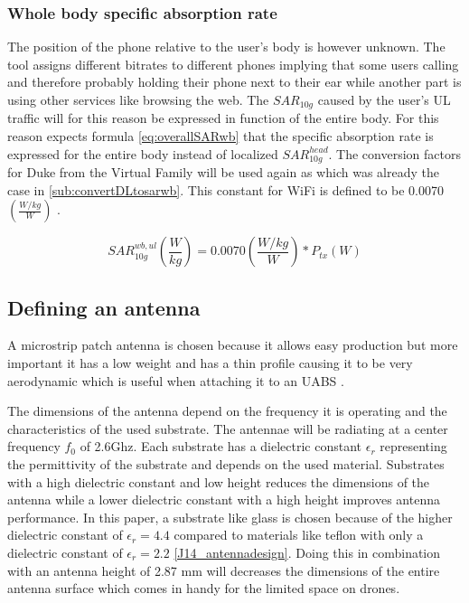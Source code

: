 \subsubsection{Whole body specific absorption rate}
The position of the phone relative to the user's body is however unknown. The tool assigns different bitrates to different phones implying 
that some users calling and therefore probably holding their phone next to their ear while another part is using other services like browsing the web.
The $SAR_{10g}$ caused by the user's \gls{UL} traffic will for this reason be expressed in function of the entire body.
For this reason expects formula \ref{eq:overallSARwb} that the specific absorption rate is expressed for the entire body instead of localized $SAR^{head}_{10g}$.
The conversion factors for Duke from the Virtual Family will be used again as which was already the case in \ref{sub:convertDLtosarwb}. This constant 
for WiFi is defined to be 0.0070 $\left(\frac{W/kg}{W}\right)$ \cite{J22_plets2015joint}.

\begin{equation} 
SAR^{wb,ul}_{10g} \left(\frac{W}{kg}\right) = 0.0070 \left(\frac{W/kg}{W}\right) * P_{tx} (W)
\label{eq:solve}
\end{equation}

\subsection{Defining an antenna}
\label{sub:definingAntenna}
A microstrip patch antenna is chosen because it allows easy production but more important it has a low weight 
and has a thin profile causing it to be very aerodynamic which is useful when attaching it to an \gls{UABS} \cite{J13_microstripadvantages}.

The dimensions of the antenna depend on the frequency it is operating and the characteristics of the used substrate.
The antennae will be radiating at a center frequency $f_0$ of 2.6Ghz. Each substrate has a dielectric constant $\epsilon_r$ representing 
the permittivity of the substrate and depends on the used material.
Substrates with a high dielectric constant and low height 
reduces the dimensions of the antenna
while a lower dielectric constant with a high height improves antenna performance. 
In this paper, a substrate like glass 
is chosen because of the higher dielectric constant of $\epsilon_r = 4.4$ compared to materials like teflon with only a dielectric 
constant of $\epsilon_r = 2.2$ \ref{J14_antennadesign}. 
Doing this in combination with an antenna height of 2.87 mm will decreases the dimensions of the entire antenna surface which comes in handy for the limited space on 
drones.

